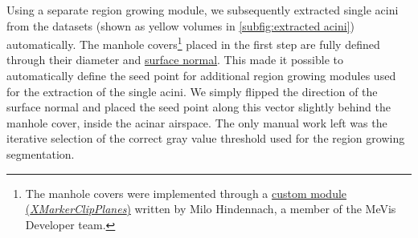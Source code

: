 \documentclass[%
	paper=a4,%
	abstract=true,%
	]{scrartcl}
\begin{document}
Using a separate region growing module, we subsequently extracted single acini from the datasets (shown as yellow volumes in \autoref{subfig:extracted acini}) automatically. The manhole covers\footnote{The manhole covers were implemented through a \href{http://www.mevis-research.de/cgi-bin/discus/board-auth.cgi?lm=1282233250&file=/839/11760.html}{custom module (\emph{XMarkerClipPlanes})} written by Milo Hindennach, a member of the MeVis Developer team.} placed in the first step are fully defined through their diameter and \href{https://secure.wikimedia.org/wikipedia/en/w/index.php?title=Surface_normal&oldid=411684319}{surface normal}. This made it possible to automatically define the seed point for additional region growing modules used for the extraction of the single acini. We simply flipped the direction of the surface normal and placed the seed point along this vector slightly behind the manhole cover, inside the acinar airspace. The only manual work left was the iterative selection of the correct gray value threshold used for the region growing segmentation.
\end{document}
